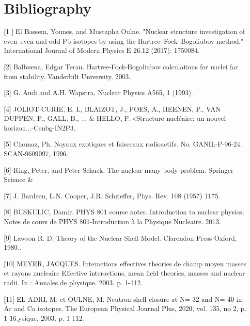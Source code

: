 \documentclass[a4paper]{article}
\begin{document}
\section{}
\section{}
\section[Bibliography]{\textenglish{Bibliography}}
\textenglish{[1 ] El Bassem, Younes, and Mustapha Oulne. "Nuclear structure investigation of even–even and odd Pb isotopes by using the Hartree–Fock–Bogoliubov method." International Journal of Modern Physics E 26.12 (2017): 1750084.}

\textenglish{[2] Balbuena, Edgar Teran. Hartree-Fock-Bogoliubov calculations for nuclei far from stability. Vanderbilt University, 2003.}

\textenglish{[3] G. Audi and A.H. Wapstra, Nuclear Physics A565, 1 (1993).}

\textenglish{[4] JOLIOT-CURIE, E. I., BLAIZOT, J., POES, A., HEENEN, P., VAN DUPPEN, P., GALL, B., ... }\& HELLO, P. «Structure nucléaire: un nouvel horizon...-Cenbg-IN2P3.

[5] Chomaz, Ph. Noyaux exotiques et faisceaux radioactifs. \textenglish{No. GANIL-P-96-24. SCAN-9609097, 1996.}

\textenglish{[6] Ring, Peter, and Peter Schuck. The nuclear many-body problem. Springer Science \&  }

\textenglish{[7] J. Bardeen, L.N. Cooper, J.R. Schrieffer, Phys. }Rev. 108 (1957) 1175.

[8] BUSKULIC, Damir. PHYS 801 course notes. Introduction to nuclear physics; Notes de cours de PHYS 801-Introduction à la Physique Nucleaire. \textenglish{2013.}

\textenglish{[9] Lawson R. D. Theory of the Nuclear Shell Model. Clarendon Press Oxford, 1980..}

\textenglish{[10] MEYER, JACQUES. Interactions effectives theories de champ moyen masses et rayons nucleaire Effective interactions, mean field theories, masses and nuclear radii. In : } \textenglish{Annales de physique. 2003. p. 1-112.}

\textenglish{[11] EL ADRI, M. et OULNE, M. Neutron shell closure at N= 32 and N= 40 in Ar and Ca isotopes. The European Physical Journal Plus, 2020, vol. 135, no 2, p. 1-16.ysique. 2003. p. 1-112.}
\end{document}
